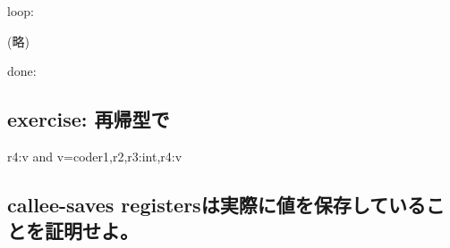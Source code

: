 \documentclass[a4paper,onepage]{ltjsarticle}
\begin{document}
loop:

(略)

done:

\begin{prooftree}
\end{prooftree}

\subsection{exercise: 再帰型で}

r4:v and v=code{r1,r2,r3:int,r4:v}
\subsection{callee-saves registersは実際に値を保存していることを証明せよ。}
\end{document}
